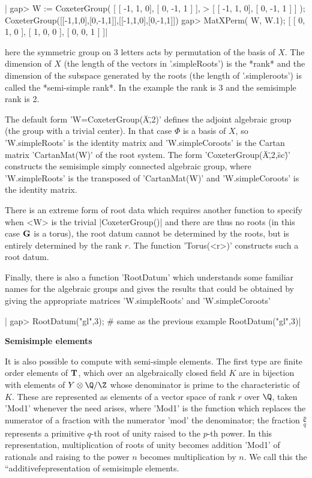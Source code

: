 |    gap> W := CoxeterGroup( [ [ -1, 1, 0], [ 0, -1, 1 ] ],
    >                       [ [ -1, 1, 0], [ 0, -1, 1 ] ] );
    CoxeterGroup([[-1,1,0],[0,-1,1]],[[-1,1,0],[0,-1,1]])
    gap> MatXPerm( W, W.1);
    [ [ 0, 1, 0 ], [ 1, 0, 0 ], [ 0, 0, 1 ] ]|

here  the symmetric group on 3 letters  acts by permutation of the basis of
$X$.  The dimension of $X$ (the length of the vectors in '.simpleRoots') is
the  *rank* and the dimension  of the subspace generated  by the roots (the
length  of '.simpleroots') is called the *semi-simple rank*. In the example
the  rank is 3 and  the semisimple rank is  2.

The  default form 'W\:=CoxeterGroup(\"A\",2)' defines the adjoint algebraic
group  (the group with a trivial center). In that case $\Phi$ is a basis of
$X$,  so 'W.simpleRoots' is the  identity matrix and 'W.simpleCoroots'
is   the  Cartan  matrix  'CartanMat(W)'  of  the  root  system.  The  form
'CoxeterGroup(\"A\",2,\"sc\")'  constructs the  semisimple simply connected
algebraic  group, where 'W.simpleRoots' is the transposed of 'CartanMat(W)'
and 'W.simpleCoroots' is the identity matrix.

There  is an extreme form  of root data which  requires another function to
specify\:  when <W> is  the trivial |CoxeterGroup()|  and there are thus no
roots  (in this case ${\mathbf G}$ is a torus), the root datum cannot be determined
by  the roots,  but is  entirely determined  by the  rank $r$. The function
'Torus(<r>)' constructs such a root datum.

Finally,  there  is  also  a  function  'RootDatum'  which understands some
familiar names for the algebraic groups and gives the results that could be
obtained   by   giving   the   appropriate   matrices  'W.simpleRoots'  and
'W.simpleCoroots'\:

|    gap> RootDatum("gl",3);   # same as the previous example
    RootDatum("gl",3)|

{\bf Semisimple elements}

It  is also possible  to compute with  semi-simple elements. The first type
are  finite order  elements of  ${\mathbf T}$, which  over an  algebraically closed
field  $K$  are  in  bijection  with  elements  of  $Y\otimes  \Q/\Z$ whose
denominator is prime to the characteristic of $K$. These are represented as
elements of a vector space of rank $r$ over $\Q$, taken 'Mod1' whenever the
need arises, where 'Mod1' is the function which replaces the numerator of a
fraction   with  the   numerator  'mod'   the  denominator;   the  fraction
$\frac{p}{q}$  represents a  primitive $q$-th  root of  unity raised to the
$p$-th  power.  In  this  representation,  multiplication of roots of unity
becomes  addition 'Mod1' of rationals and  raising to the power $n$ becomes
multiplication  by $n$. We  call this the  ``additive\'\' representation of
semisimple elements.

